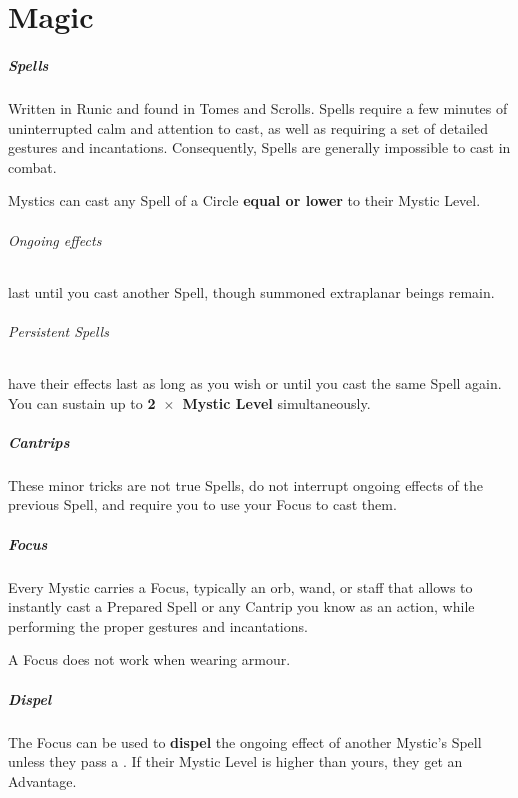 \documentclass[itdr]{subfiles}
\begin{document}
\chapter{Magic}
\label{ch:magic}

\paragraph{Spells}
Written in Runic and found in Tomes and Scrolls. Spells require a few minutes of uninterrupted calm and attention to cast, as well as requiring a set of detailed gestures and incantations. Consequently, Spells are generally impossible to cast in combat.

Mystics can cast any Spell of a Circle \textbf{equal or lower} to their Mystic Level.

\subparagraph{Ongoing effects} last until you cast another Spell, though summoned extraplanar beings remain.

\subparagraph{Persistent Spells} have their effects last as long as you wish or until you cast the same Spell again. You can sustain up to \textbf{2~$\times$~Mystic Level} simultaneously.

\vfill
{}
\paragraph{Cantrips}
These minor tricks are not true Spells, do not interrupt ongoing effects of the previous Spell, and require you to use your Focus to cast them.

\vfill
{}
\paragraph{Focus}
Every Mystic carries a Focus, typically an orb, wand, or staff that allows to instantly cast a Prepared Spell or any Cantrip you know as an action, while performing the proper gestures and incantations.

A Focus does not work when wearing armour.

\paragraph{Dispel}
The Focus can be used to \textbf{dispel} the ongoing effect of another Mystic's Spell unless they pass a . If their Mystic Level is higher than yours, they get an Advantage.
\end{document}

